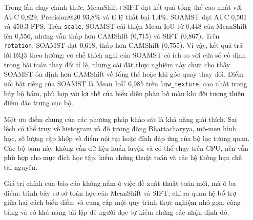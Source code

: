 \documentclass[12pt,a4paper]{article}
\newcommand{\scenario}[1]{\texttt{#1}}
\numberwithin{equation}{section}
\begin{document}
Trong lần chạy chính thức, MeanShift+SIFT đạt kết quả tổng thể cao nhất với AUC 0,829,
Precision@20 93,8\% và tỉ lệ thất bại 1,4\%. SOAMST đạt AUC 0,501 và 450,3 FPS. Trên
\scenario{scale}, SOAMST cải thiện Mean IoU từ 0,448 của MeanShift lên 0,556, nhưng vẫn thấp hơn
CAMShift (0,715) và SIFT (0,867). Trên \scenario{rotation}, SOAMST đạt 0,618, thấp hơn CAMShift
(0,755). Vì vậy, kết quả trả lời RQ3 theo hướng: cơ chế thích nghi của SOAMST có ích so với cửa sổ
cố định trong bài toán thay đổi tỉ lệ, nhưng cài đặt thực nghiệm này chưa cho thấy SOAMST ổn định
hơn CAMShift về tổng thể hoặc khi góc quay thay đổi. Điểm nổi bật riêng của SOAMST là Mean IoU
0,985 trên \scenario{low\_texture}, cao nhất trong bảy bộ bám, phù hợp với lợi thế của biểu diễn
phân bố màu khi đối tượng thiếu điểm đặc trưng cục bộ.

Một ưu điểm chung của các phương pháp khảo sát là khả năng giải thích. Sai lệch có thể truy về
histogram và độ tương đồng Bhattacharyya, mô-men hình học, số lượng cặp khớp và điểm nội tại hoặc đỉnh đáp ứng
của bộ lọc tương quan. Các bộ bám này không cần dữ liệu huấn luyện và có thể chạy trên CPU, nên
vẫn phù hợp cho mục đích học tập, kiểm chứng thuật toán và các hệ thống hạn chế tài nguyên.

Giá trị chính của báo cáo không nằm ở việc đề xuất thuật toán mới, mà ở ba điểm: trình bày cơ sở
toán học của MeanShift và SIFT; chỉ ra quan hệ bổ trợ giữa hai cách biểu diễn; và cung cấp một quy
trình thực nghiệm nhỏ gọn, công bằng và có khả năng tái lập để người đọc tự kiểm chứng các nhận
định đó.
\end{document}
